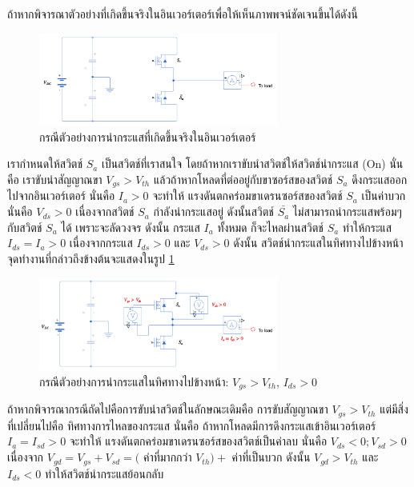 \documentclass[11pt,a4paper]{article}
\begin{document}
ถ้าหากพิจารณาตัวอย่างที่เกิดขึ้นจริงในอินเวอร์เตอร์เพื่อให้เห็นภาพพจน์ชัดเจนขึ้นได้ดังนี้

\begin{figure}[h!]
    \begin{center}
        \includegraphics[width=0.7\textwidth]{first_third_inverter.png}
    \end{center}
    \caption{กรณีตัวอย่างการนำกระแสที่เกิดขึ้นจริงในอินเวอร์เตอร์}
\end{figure}

เรากำหนดให้สวิตช์ $S_a$ เป็นสวิตช์ที่เราสนใจ โดยถ้าหากเราขับนำสวิตช์ให้สวิตช์นำกระแส (On) นั่นคือ เราขับนำสัญญาณขา $V_{gs} > V_{th}$ แล้วถ้าหากโหลดที่ต่ออยู่กับขาซอร์สของสวิตช์ $S_a$ ดึงกระแสออกไปจากอินเวอร์เตอร์ นั่นคือ $I_a > 0$ จะทำให้ แรงดันตกคร่อมขาเดรนซอร์สของสวิตช์ $S_a$ เป็นค่าบวก นั่นคือ $V_{ds} > 0$ เนื่องจากสวิตช์ $S_a$ กำลังนำกระแสอยู่ ดังนั้นสวิตช์ $\bar{S_a}$ ไม่สามารถนำกระแสพร้อมๆ กับสวิตช์ $S_a$ ได้ เพราะจะลัดวงจร ดังนั้น กระแส $I_a$ ทั้งหมด ก็จะไหลผ่านสวิตช์ $S_a$ ทำให้กระแส $I_{ds} = I_a > 0$ เนื่องจากกระแส $I_{ds} > 0$ และ $V_{ds} > 0$ ดังนั้น สวิตช์นํากระแสในทิศทางไปข้างหน้า จุดทำงานที่กล่าวถึงข้างต้นจะแสดงในรูป \ref{inverter_q1}

\begin{figure}[h!]
    \begin{center}
        \includegraphics[width=0.7\textwidth]{inverter_q1.png}
    \end{center}
    \caption{กรณีตัวอย่างการนำกระแสในทิศทางไปข้างหน้า: $V_{gs} > V_{th}$, $I_{ds} > 0$}
    \label{inverter_q1}
\end{figure}

ถ้าหากพิจารณากรณีถัดไปคือการขับนำสวิตช์ในลักษณะเดิมคือ การขับสัญญาณขา $V_{gs} > V_{th}$ แต่มีสิ่งที่เปลี่ยนไปคือ ทิศทางการไหลของกระแส นั่นคือ ถ้าหากโหลดมีการดึงกระแสเข้าอินเวอร์เตอร์ $I_a = I_{sd} >0$ จะทำให้ แรงดันตกคร่อมขาเดรนซอร์สของสวิตช์เป็นค่าลบ นั่นคือ $V_{ds} <0; V_{sd} > 0$ เนื่องจาก $V_{gd} = V_{gs} + V_{sd} =($ ค่าที่มากกว่า $V_{th})+$ ค่าที่เป็นบวก ดังนั้น $V_{gd} > V_{th}$ และ $I_{ds} < 0$ ทำให้สวิตช์นำกระแสย้อนกลับ
\end{document}
